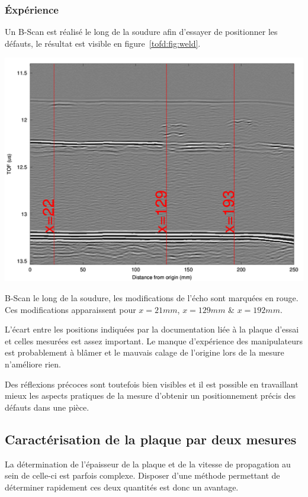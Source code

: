 \subsubsection{Éxpérience}

Un B-Scan est réalisé le long de la soudure afin d'essayer de positionner les défauts, le
résultat est visible en figure~\ref{tofd:fig:weld}.

\begin{figurehere}
	\centering
	\includegraphics[width=0.8\linewidth]{tofd_figs/soudure.png}
	\caption{B-Scan le long de la soudure, les modifications de l'écho sont marquées en
	rouge. Ces modifications apparaissent pour $x=21mm$, $x=129mm$ \& $x=192mm$.}
	\label{tofd:fig:weld}
\end{figurehere}

L'écart entre les positions indiquées par la documentation liée à la plaque d'essai et
celles mesurées est assez important. Le manque d'expérience des manipulateurs est
probablement à blâmer et le mauvais calage de l'origine lors de la mesure n'améliore rien.

Des réflexions précoces sont toutefois bien visibles et il est possible en travaillant
mieux les aspects pratiques de la mesure d'obtenir un positionnement précis des défauts
dans une pièce.

\subsection{Caractérisation de la plaque par deux mesures}

La détermination de l'épaisseur de la plaque et de la vitesse de propagation au sein de
celle-ci est parfois complexe. Disposer d'une méthode permettant de déterminer rapidement
ces deux quantités est donc un avantage.

